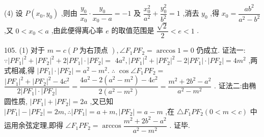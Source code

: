 (4) 设 $P\left( {{x}_{0},{y}_{0}}\right)$ ,则由 $\dfrac{{y}_{0}}{{x}_{0}} \cdot  \dfrac{{y}_{0}}{{x}_{0} - a} =  - 1$ 及 $\dfrac{{x}_{0}^{2}}{{a}^{2}} + \dfrac{{y}_{0}^{2}}{{b}^{2}} = 1$ ,消去 ${y}_{0}$ ,得 ${x}_{0} = \dfrac{a{b}^{2}}{{a}^{2} - {b}^{2}}$ ,又 $0 < {x}_{0} < a$ ,由此便得离心率 $e$ 的取值范围是 $\dfrac{\sqrt{2}}{2} < e < 1$ .

105. (1) 对于 $m = c\left( {P\text{ 为右顶点 }}\right) ,\angle {F}_{1}P{F}_{2} = \arccos 1 = 0$ 仍成立. 证法一: $\because {\left| P{F}_{1}\right| }^{2} + {\left| P{F}_{2}\right| }^{2} + 2\left| {P{F}_{1}}\right|  \cdot  \left| {P{F}_{2}}\right|  =$  $4{a}^{2},{\left| P{F}_{1}\right| }^{2} + {\left| P{F}_{2}\right| }^{2} - 2\left| {P{F}_{1}}\right|  \cdot  \left| {P{F}_{2}}\right|  = 4{m}^{2}$ ,两式相减,得 $\left| {P{F}_{1}}\right|  \cdot  \left| {P{F}_{2}}\right|  = {a}^{2} - {m}^{2}.\;\therefore \;\cos \angle {F}_{1}P{F}_{2} =$  $\dfrac{{\left| P{F}_{1}\right| }^{2} + {\left| P{F}_{2}\right| }^{2} - 4{c}^{2}}{2\left| {P{F}_{1}}\right|  \cdot  \left| {P{F}_{2}}\right| } = \dfrac{4{a}^{2} - 2\left( {{a}^{2} - {m}^{2}}\right)  - 4{c}^{2}}{2\left( {{a}^{2} - {m}^{2}}\right) } = \dfrac{{m}^{2} + 2{b}^{2} - {a}^{2}}{{a}^{2} - {m}^{2}}$ . 证法二:由椭圆性质, $\left| {P{F}_{1}}\right|  + \left| {P{F}_{2}}\right|  = {2a}$ ,又已知 $\left| {P{F}_{1}}\right|  - \left| {P{F}_{2}}\right|  = {2m},\therefore \left| {P{F}_{1}}\right|  = a + m,\left| {P{F}_{2}}\right|  = a - m$ ,在 $\bigtriangleup {F}_{1}P{F}_{2}\left( {0 < m < c}\right)$ 中运用余弦定理,即得 $\angle {F}_{1}P{F}_{2} = \arccos \dfrac{{m}^{2} + 2{b}^{2} - {a}^{2}}{{a}^{2} - {m}^{2}}$ . 证毕.

